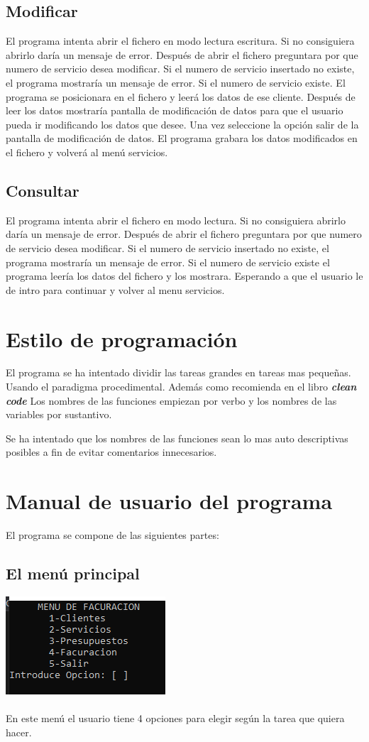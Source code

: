 \documentclass[12pt]{article}
\begin{document}
\subsection{Modificar}
El programa intenta abrir el fichero en modo lectura escritura. Si no consiguiera abrirlo daría un mensaje de error. Después de abrir el fichero preguntara por que numero de servicio desea modificar. Si el numero de servicio insertado no existe, el programa mostraría un mensaje de error. Si el numero de servicio existe. El programa se posicionara en el fichero y leerá los datos de ese cliente. Después de leer los datos mostraría pantalla de modificación de datos para que el usuario pueda ir modificando los datos que desee. Una vez seleccione la opción salir de la pantalla de modificación de datos. El programa grabara los datos modificados en el fichero y volverá al menú servicios.
\subsection{Consultar}
El programa intenta abrir el fichero en modo lectura. Si no consiguiera abrirlo daría un mensaje de error. Después de abrir el fichero preguntara por que numero de servicio desea modificar. Si el numero de servicio insertado no existe, el programa mostraría un mensaje de error. Si el numero de servicio existe el programa leería los datos del fichero y los mostrara. Esperando a que el usuario le de intro para continuar y volver al menu servicios.

\newpage
\section{Estilo de programación}
El programa se ha intentado dividir las tareas grandes en tareas mas pequeñas. Usando el paradigma procedimental. Además como recomienda en el libro \textbf{\textit{clean code} }Los nombres de las funciones empiezan por verbo y los nombres de las variables por sustantivo.

Se ha intentado que los nombres de las funciones sean lo mas auto descriptivas posibles a fin de evitar comentarios innecesarios.

\newpage
\section{Manual de usuario del programa}
El programa se compone de las siguientes partes:
\subsection{El menú principal}
\includegraphics[]{MenuPrincipal.PNG}\\\\
En este menú el usuario tiene 4 opciones para elegir según la tarea que quiera hacer.
\end{document}
